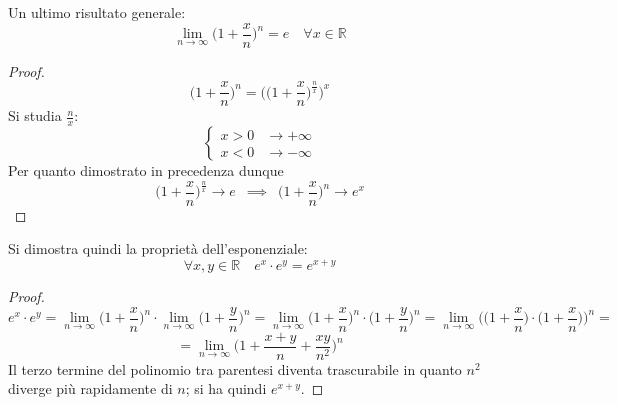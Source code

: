 \documentclass[10pt, oneside]{book}
\theoremstyle{plain}
\begin{document}
Un ultimo risultato generale:
\[\lim \limits_{n \rightarrow \infty} \bigg(1 + \frac{x}{n}\bigg)^{n} = e \quad \forall x \in \mathbb{R}\]
\begin{proof}
    \[\bigg(1 + \frac{x}{n}\bigg)^{n} = \Bigg(\bigg(1 + \frac{x}{n}\bigg)^{\frac{n}{x}}\Bigg)^x\]
    Si studia $\frac{n}{x}$:
    \[\begin{cases}
        x > 0 & \rightarrow +\infty\\
        x < 0 & \rightarrow - \infty
    \end{cases}\]
    Per quanto dimostrato in precedenza dunque 
    \[\bigg(1 + \frac{x}{n}\bigg)^{\frac{n}{x}} \rightarrow e \enspace \implies \enspace \bigg(1 + \frac{x}{n}\bigg)^{n} \rightarrow e^x\]
\end{proof}
Si dimostra quindi la proprietà dell'esponenziale:
\[\forall x, y \in \mathbb{R} \quad e^x \cdot e^y = e^{x+y}\]
\begin{proof}
    \[e^x \cdot e^y = \lim \limits_{n \rightarrow \infty} \bigg(1 + \frac{x}{n}\bigg)^{n} \cdot \lim \limits_{n \rightarrow \infty} \bigg(1 + \frac{y}{n}\bigg)^{n} = \lim \limits_{n \rightarrow \infty} \bigg(1 + \frac{x}{n}\bigg)^{n} \cdot \bigg(1 + \frac{y}{n}\bigg)^{n} = \lim \limits_{n \rightarrow \infty} \Bigg(\bigg(1 + \frac{x}{n}\bigg) \cdot \bigg(1 + \frac{x}{n}\bigg) \Bigg)^{n} =\]
    \[= \lim \limits_{n \rightarrow \infty} \bigg(1 + \frac{x+y}{n} + \frac{xy}{n^2}\bigg)^{n}\]
    Il terzo termine del polinomio tra parentesi diventa trascurabile in quanto $n^2$ diverge più rapidamente di $n$; si ha quindi $e^{x+y}$.

    
\end{proof}
\end{document}
